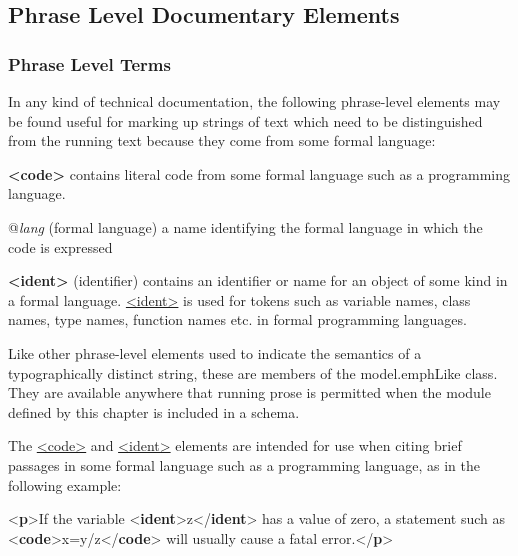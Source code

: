 \subsection[{Phrase Level Documentary Elements}]{Phrase Level Documentary Elements}\label{TDphrase}
\subsubsection[{Phrase Level Terms}]{Phrase Level Terms}\label{TDphraseTE}\par
In any kind of technical documentation, the following phrase-level elements may be found useful for marking up strings of text which need to be distinguished from the running text because they come from some formal language: 
\begin{sansreflist}
  
\item [\textbf{<code>}] contains literal code from some formal language such as a programming language.\hfil\\[-10pt]\begin{sansreflist}
    \item[@{\itshape lang}]
  (formal language) a name identifying the formal language in which the code is expressed
\end{sansreflist}  
\item [\textbf{<ident>}] (identifier) contains an identifier or name for an object of some kind in a formal language. \hyperref[TEI.ident]{<ident>} is used for tokens such as variable names, class names, type names, function names etc. in formal programming languages.
\end{sansreflist}
 Like other phrase-level elements used to indicate the semantics of a typographically distinct string, these are members of the \textsf{model.emphLike} class. They are available anywhere that running prose is permitted when the module defined by this chapter is included in a schema.\par
The \hyperref[TEI.code]{<code>} and \hyperref[TEI.ident]{<ident>} elements are intended for use when citing brief passages in some formal language such as a programming language, as in the following example: \par\bgroup{}\exampleFont \begin{shaded}\noindent\mbox{}{<\textbf{p}>}If the variable {<\textbf{ident}>}z{</\textbf{ident}>} has a value of zero, a statement such as {<\textbf{code}>}x=y/z{</\textbf{code}>} will\mbox{}\newline 
 usually cause a fatal error.{</\textbf{p}>}\end{shaded}\egroup\par \par
